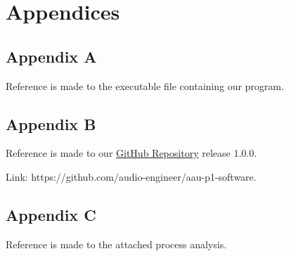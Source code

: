 \chapter*{Appendices}

\section*{Appendix A}\label{sec:appendix-a}

Reference is made to the executable file containing our program.

\section*{Appendix B}\label{sec:appendix-b}

Reference is made to our \href{https://github.com/audio-engineer/aau-p1-software}{GitHub Repository} release 1.0.0.

Link: https://github.com/audio-engineer/aau-p1-software.

\section*{Appendix C}\label{sec:appendix-c}

Reference is made to the attached process analysis.
